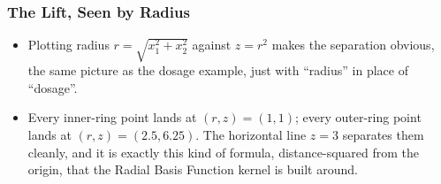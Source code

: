 \begin{frame}[fragile] \frametitle{The Lift, Seen by Radius}
\begin{itemize}
\item Plotting radius $r=\sqrt{x_1^2+x_2^2}$ against $z=r^2$ makes the separation obvious, the same picture as the dosage example, just with ``radius'' in place of ``dosage''.
\end{itemize}
\begin{center}
\end{center}
\begin{itemize}
\item Every inner-ring point lands at $(r,z)=(1,1)$; every outer-ring point lands at $(r,z)=(2.5,6.25)$. The horizontal line $z=3$ separates them cleanly, and it is exactly this kind of formula, distance-squared from the origin, that the Radial Basis Function kernel is built around.
\end{itemize}
\end{frame}

%
%
%
%
%
%
%
%


